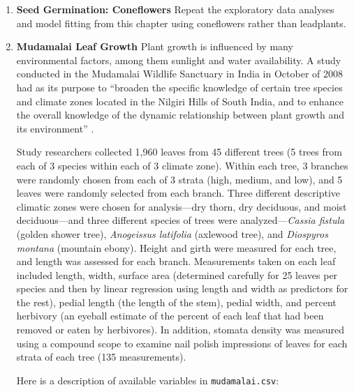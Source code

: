 \documentclass[
]{krantz}
\begin{document}
\begin{enumerate}
\def\labelenumi{\arabic{enumi}.}
\item
  \textbf{Seed Germination: Coneflowers} Repeat the exploratory data analyses and model fitting from this chapter using coneflowers rather than leadplants.
\item
  \textbf{Mudamalai Leaf Growth} Plant growth is influenced by many environmental factors, among them sunlight and water availability. A study conducted in the Mudamalai Wildlife Sanctuary in India in October of 2008 had as its purpose to ``broaden the specific knowledge of certain tree species and climate zones located in the Nilgiri Hills of South India, and to enhance the overall knowledge of the dynamic relationship between plant growth and its environment'' \citep{Pray2009}.

  Study researchers collected 1,960 leaves from 45 different trees (5 trees from each of 3 species within each of 3 climate zone). Within each tree, 3 branches were randomly chosen from each of 3 strata (high, medium, and low), and 5 leaves were randomly selected from each branch. Three different descriptive climatic zones were chosen for analysis---dry thorn, dry deciduous, and moist deciduous---and three different species of trees were analyzed---\emph{Cassia fistula} (golden shower tree), \emph{Anogeissus latifolia} (axlewood tree), and \emph{Diospyros montana} (mountain ebony). Height and girth were measured for each tree, and length was assessed for each branch. Measurements taken on each leaf included length, width, surface area (determined carefully for 25 leaves per species and then by linear regression using length and width as predictors for the rest), pedial length (the length of the stem), pedial width, and percent herbivory (an eyeball estimate of the percent of each leaf that had been removed or eaten by herbivores). In addition, stomata density was measured using a compound scope to examine nail polish impressions of leaves for each strata of each tree (135 measurements).

  Here is a description of available variables in \texttt{mudamalai.csv}:


\end{enumerate}
\end{document}
